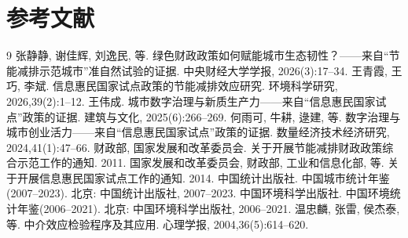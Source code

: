 \documentclass[lang=cn,a4paper,11pt]{elegantpaper}
\begin{document}
\section*{参考文献}

\begin{thebibliography}{9}
 张静静, 谢佳辉, 刘逸民, 等. 绿色财政政策如何赋能城市生态韧性？——来自“节能减排示范城市”准自然试验的证据. 中央财经大学学报, 2026(3):17--34.
 王青霞, 王巧, 李斌. 信息惠民国家试点政策的节能减排效应研究. 环境科学研究, 2026,39(2):1--12.
 王伟成. 城市数字治理与新质生产力——来自“信息惠民国家试点”政策的证据. 建筑与文化, 2025(6):266--269.
 何雨可, 牛耕, 逯建, 等. 数字治理与城市创业活力——来自“信息惠民国家试点”政策的证据. 数量经济技术经济研究, 2024,41(1):47--66.
 财政部, 国家发展和改革委员会. 关于开展节能减排财政政策综合示范工作的通知. 2011.
 国家发展和改革委员会, 财政部, 工业和信息化部, 等. 关于开展信息惠民国家试点工作的通知. 2014.
 中国统计出版社. 中国城市统计年鉴(2007--2023). 北京: 中国统计出版社, 2007--2023.
 中国环境科学出版社. 中国环境统计年鉴(2006--2021). 北京: 中国环境科学出版社, 2006--2021.
 温忠麟, 张雷, 侯杰泰, 等. 中介效应检验程序及其应用. 心理学报, 2004,36(5):614--620.
\end{thebibliography}
\end{document}
